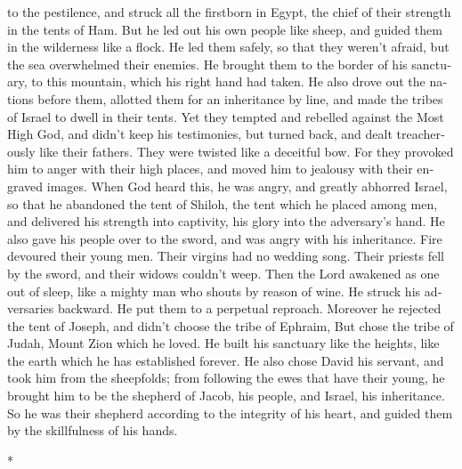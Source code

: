 \begin{paracol}{2}
\begin{otherlanguage}{english}
to the pestilence,  and struck all the firstborn in
Egypt, the chief of their strength in the tents of Ham. 
But he led out his own people like sheep, and guided them in the
wilderness like a flock.  He led them safely, so that
they weren't afraid, but the sea overwhelmed their enemies.
 He brought them to the border of his sanctuary, to this
mountain, which his right hand had taken.  He also drove
out the nations before them, allotted them for an inheritance by line,
and made the tribes of Israel to dwell in their tents. 
Yet they tempted and rebelled against the Most High God, and didn't keep
his testimonies,  but turned back, and dealt
treacherously like their fathers. They were twisted like a deceitful
bow.  For they provoked him to anger with their high
places, and moved him to jealousy with their engraved images.
 When God heard this, he was angry, and greatly abhorred
Israel,  so that he abandoned the tent of Shiloh, the
tent which he placed among men,  and delivered his
strength into captivity, his glory into the adversary's hand.
 He also gave his people over to the sword, and was angry
with his inheritance.  Fire devoured their young men.
Their virgins had no wedding song.  Their priests fell by
the sword, and their widows couldn't weep.  Then the Lord
awakened as one out of sleep, like a mighty man who shouts by reason of
wine.  He struck his adversaries backward. He put them to
a perpetual reproach.  Moreover he rejected the tent of
Joseph, and didn't choose the tribe of Ephraim,  But
chose the tribe of Judah, Mount Zion which he loved.  He
built his sanctuary like the heights, like the earth which he has
established forever.  He also chose David his servant,
and took him from the sheepfolds;  from following the
ewes that have their young, he brought him to be the shepherd of Jacob,
his people, and Israel, his inheritance.  So he was their
shepherd according to the integrity of his heart, and guided them by the
skillfulness of his hands.

\end{otherlanguage}

\switchcolumn[0]*

\hypertarget{lamentaciuxf3n-del-pueblo-de-dios-por-la-desolaciuxf3n-de-jerusaluxe9n}{%
}
\end{paracol}
